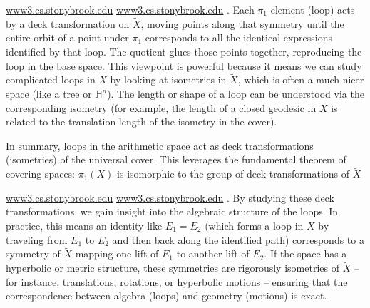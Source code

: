 \documentclass[11pt]{article}
\theoremstyle{remark}
\begin{document}
\href{https://www3.cs.stonybrook.edu/~gu/lectures/2022/Lecture_1/2022_Summer_CCG_Lecture_1.pdf#:~:text=Definition%20,3%2C%202022%2044%20%2F%2059}{www3.cs.stonybrook.edu}
\href{https://www3.cs.stonybrook.edu/~gu/lectures/2022/Lecture_1/2022_Summer_CCG_Lecture_1.pdf#:~:text=The%20quotient%20group%20of%20%CF%801,deck%20transformation%20group%20of%20S%CB%9C}{www3.cs.stonybrook.edu}
. Each $\pi_1$ element (loop) acts by a deck transformation on $\widetilde{X}$, moving points along that symmetry until the entire orbit of a point under $\pi_1$ corresponds to all the identical expressions identified by that loop. The quotient glues those points together, reproducing the loop in the base space. This viewpoint is powerful because it means we can study complicated loops in $X$ by looking at isometries in $\widetilde{X}$, which is often a much nicer space (like a tree or $\mathbb{H}^n$). The length or shape of a loop can be understood via the corresponding isometry (for example, the length of a closed geodesic in $X$ is related to the translation length of the isometry in the cover).

In summary, loops in the arithmetic space act as deck transformations (isometries) of the universal cover. This leverages the fundamental theorem of covering spaces: $\pi_1(X)$ is isomorphic to the group of deck transformations of $\widetilde{X}$

\href{https://www3.cs.stonybrook.edu/~gu/lectures/2022/Lecture_1/2022_Summer_CCG_Lecture_1.pdf#:~:text=Definition%20,3%2C%202022%2044%20%2F%2059}{www3.cs.stonybrook.edu}
\href{https://www3.cs.stonybrook.edu/~gu/lectures/2022/Lecture_1/2022_Summer_CCG_Lecture_1.pdf#:~:text=The%20quotient%20group%20of%20%CF%801,deck%20transformation%20group%20of%20S%CB%9C}{www3.cs.stonybrook.edu}
. By studying these deck transformations, we gain insight into the algebraic structure of the loops. In practice, this means an identity like $E_1 = E_2$ (which forms a loop in $X$ by traveling from $E_1$ to $E_2$ and then back along the identified path) corresponds to a symmetry of $\widetilde{X}$ mapping one lift of $E_1$ to another lift of $E_2$. If the space has a hyperbolic or metric structure, these symmetries are rigorously isometries of $\widetilde{X}$ – for instance, translations, rotations, or hyperbolic motions – ensuring that the correspondence between algebra (loops) and geometry (motions) is exact.
\end{document}
